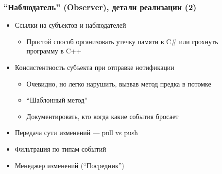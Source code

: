 \documentclass[xetex,mathserif,serif]{beamer}
\begin{document}
	\begin{frame}
		\frametitle{``Наблюдатель'' (Observer), детали реализации (2)}
		\begin{itemize}
			\item Ссылки на субъектов и наблюдателей
			\begin{itemize}
				\item Простой способ организовать утечку памяти в C\# или грохнуть программу в C++
			\end{itemize}
			\item Консистентность субъекта при отправке нотификации
			\begin{itemize}
				\item Очевидно, но легко нарушить, вызвав метод предка в потомке
				\item ``Шаблонный метод''
				\item Документировать, кто когда какие события бросает
			\end{itemize}
			\item Передача сути изменений --- pull vs push
			\item Фильтрация по типам событий
			\item Менеджер изменений (``Посредник'')
		\end{itemize}
	\end{frame}
\end{document}
